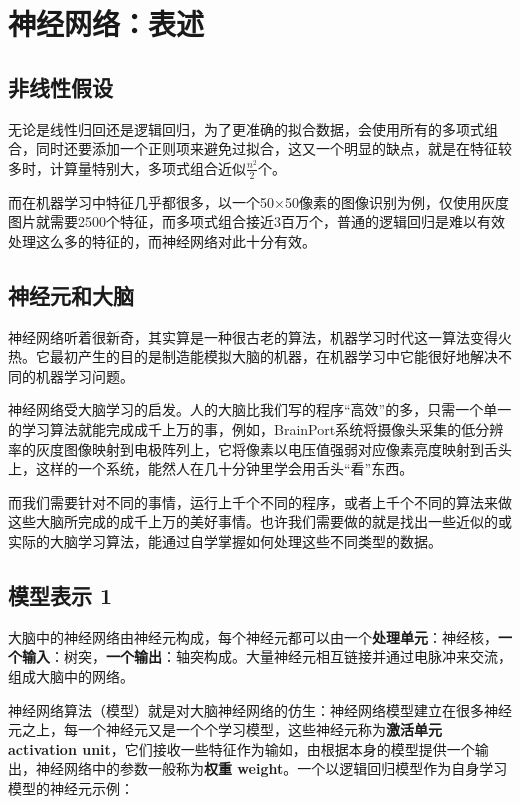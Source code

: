 \documentclass[../main.tex]{subfiles}
\begin{document}
\chapter{神经网络：表述}
\section{非线性假设}
无论是线性归回还是逻辑回归，为了更准确的拟合数据，会使用所有的多项式组合，同时还要添加一个正则项来避免过拟合，这又一个明显的缺点，就是在特征较多时，计算量特别大，多项式组合近似\(\frac{n^2}{2}\)个。


而在机器学习中特征几乎都很多，以一个50×50像素的图像识别为例，仅使用灰度图片就需要2500个特征，而多项式组合接近3百万个，普通的逻辑回归是难以有效处理这么多的特征的，而神经网络对此十分有效。

\section{神经元和大脑}
神经网络听着很新奇，其实算是一种很古老的算法，机器学习时代这一算法变得火热。它最初产生的目的是制造能模拟大脑的机器，在机器学习中它能很好地解决不同的机器学习问题。


神经网络受大脑学习的启发。人的大脑比我们写的程序“高效”的多，只需一个单一的学习算法就能完成成千上万的事，例如，BrainPort系统将摄像头采集的低分辨率的灰度图像映射到电极阵列上，它将像素以电压值强弱对应像素亮度映射到舌头上，这样的一个系统，能然人在几十分钟里学会用舌头“看”东西。


而我们需要针对不同的事情，运行上千个不同的程序，或者上千个不同的算法来做这些大脑所完成的成千上万的美好事情。也许我们需要做的就是找出一些近似的或实际的大脑学习算法，能通过自学掌握如何处理这些不同类型的数据。


\section{模型表示 1}
大脑中的神经网络由神经元构成，每个神经元都可以由一个\textbf{处理单元}：神经核，\textbf{一个输入}：树突，\textbf{一个输出}：轴突构成。大量神经元相互链接并通过电脉冲来交流，组成大脑中的网络。


神经网络算法（模型）就是对大脑神经网络的仿生：神经网络模型建立在很多神经元之上，每一个神经元又是一个个学习模型，这些神经元称为\textbf{激活单元 activation unit}，它们接收一些特征作为输如，由根据本身的模型提供一个输出，神经网络中的参数一般称为\textbf{权重 weight}。一个以逻辑回归模型作为自身学习模型的神经元示例：
\end{document}

